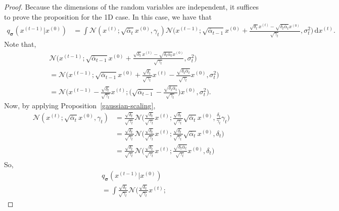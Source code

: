 \documentclass[10pt]{article}
\newcommand{\dee}{\mathrm{d}}
\newcommand{\ves}[1]{\boldsymbol{#1}}
\newcommand{\mcal}[1]{\mathcal{#1}}
\begin{document}
\begin{itemize}
\begin{proof}
  Because the dimensions of the random variables are independent, it suffices to prove the proposition for the 1D case. In this case, we have that
  \begin{align*}
    q_{\ves{\sigma}}(x^{(t-1)}|x^{(0)}) 
    &= \int \mcal{N}(x^{(t)}; \sqrt{\overline{\alpha}_t} x^{(0)}, \gamma_t)
    \mcal{N}\bigg(x^{(t-1)};\sqrt{\overline{\alpha}_{t-1}} x^{(0)} + \frac{\sqrt{\delta_t}x^{(t)} - \sqrt{\delta_t \overline{\alpha}_t}x^{(0)}}{\sqrt{\gamma_t}}, \sigma^2_t  \bigg)\, \dee x^{(t)}.
  \end{align*}
  Note that,
  \begin{align*}
    &\mcal{N}\bigg(x^{(t-1)};\sqrt{\overline{\alpha}_{t-1}} x^{(0)} + \frac{\sqrt{\delta_t}x^{(t)} - \sqrt{\delta_t \overline{\alpha}_t}x^{(0)}}{\sqrt{\gamma_t}}, \sigma^2_t  \bigg)\\
    &= \mcal{N}\bigg(x^{(t-1)};\sqrt{\overline{\alpha}_{t-1}} x^{(0)} + \frac{\sqrt{\delta_t} }{\sqrt{\gamma_t}} x^{(t)} - \frac{\sqrt{\delta_t \overline{\alpha}_t} }{\sqrt{\gamma_t}} x^{(0)}, \sigma^2_t \bigg) \\
    &= \mcal{N}\bigg(x^{(t-1)} - \frac{\sqrt{\delta_t} }{\sqrt{\gamma_t}} x^{(t)} ; \bigg( \sqrt{\overline{\alpha}_{t-1}}  - \frac{\sqrt{\delta_t \overline{\alpha}_t} }{\sqrt{\gamma_t}} \bigg) x^{(0)}, \sigma^2_t \bigg).
  \end{align*}
  Now, by applying Proposition~\ref{gaussian-scaling},
  \begin{align*}
    \mcal{N}(x^{(t)}; \sqrt{\overline{\alpha}_t}x^{(0)}, \gamma_t ) 
    &= \frac{\sqrt{\delta_t} }{\sqrt{\gamma_t}} \mcal{N}\bigg( \frac{\sqrt{\delta_t} }{\sqrt{\gamma_t}} x^{(t)}; \frac{\sqrt{\delta_t} }{\sqrt{\gamma_t}} \sqrt{\overline{\alpha}_t}x^{(0)}, \frac{\delta_t }{\gamma_t} \gamma_t \bigg) \\
    &= \frac{\sqrt{\delta_t} }{\sqrt{\gamma_t}} \mcal{N}\bigg( \frac{\sqrt{\delta_t} }{\sqrt{\gamma_t}} x^{(t)}; \frac{\sqrt{\delta_t} }{\sqrt{\gamma_t}} \sqrt{\overline{\alpha}_t}x^{(0)}, \delta_t \bigg) \\
    &= \frac{\sqrt{\delta_t} }{\sqrt{\gamma_t}} \mcal{N}\bigg( \frac{\sqrt{\delta_t} }{\sqrt{\gamma_t}} x^{(t)}; \frac{\sqrt{\delta_t \overline{\alpha}_t} }{\sqrt{\gamma_t}} x^{(0)}, \delta_t \bigg)
  \end{align*}
  So,
  \begin{align*}
    &q_{\ves{\sigma}}(x^{(t-1)}|x^{(0)}) \\
    &= \int \frac{\sqrt{\delta_t} }{\sqrt{\gamma_t}} 
    \mcal{N}\bigg( 
      \frac{\sqrt{\delta_t} }{\sqrt{\gamma_t}} x^{(t)}; 

\end{align*}
\end{proof}
\end{itemize}
\end{document}
